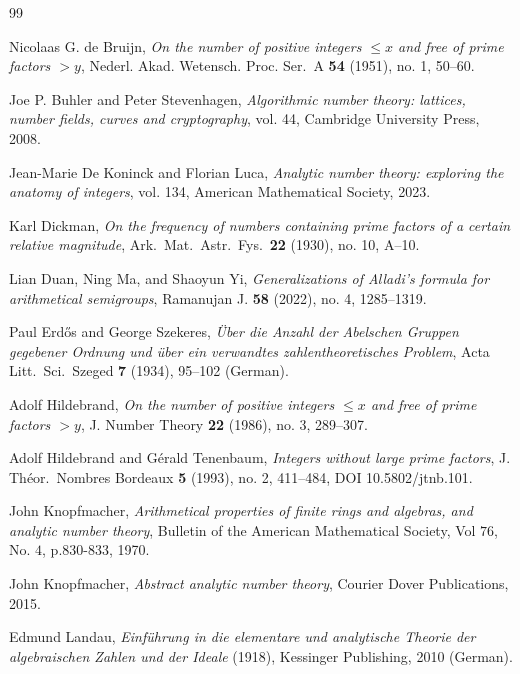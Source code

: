 \documentclass[a4paper]{amsart}
\begin{document}
\begin{thebibliography}{99}
 
Nicolaas G. de Bruijn, \emph{On the number of positive integers ${}\leq x$ and free of prime factors ${}> y$}, Nederl. Akad. Wetensch. Proc. Ser.\ A \textbf{54} (1951), no. 1, 50--60.
 
Joe P. Buhler and Peter Stevenhagen, \emph{Algorithmic number theory: lattices, number fields, curves and cryptography}, vol. 44, Cambridge University Press, 2008.
 
Jean-Marie De Koninck and Florian Luca, \emph{Analytic number theory: exploring the anatomy of integers}, vol. 134, American Mathematical Society, 2023.
 
Karl Dickman, \emph{On the frequency of numbers containing prime factors of a certain relative magnitude}, Ark.\ Mat.\ Astr.\ Fys.\ \textbf{22} (1930), no. 10, A--10.
 
Lian Duan, Ning Ma, and Shaoyun Yi, \emph{Generalizations of Alladi's formula for arithmetical semigroups}, Ramanujan J. \textbf{58} (2022), no. 4, 1285--1319.
 
Paul Erd\H{o}s and George Szekeres, \emph{\"Uber die Anzahl der Abelschen Gruppen gegebener Ordnung und \"uber ein verwandtes zahlentheoretisches Problem}, Acta Litt.\ Sci.\ Szeged \textbf{7} (1934), 95--102 (German).
 
Adolf Hildebrand, \emph{On the number of positive integers ${}\leq x$ and free of prime factors ${}> y$}, J. Number Theory \textbf{22} (1986), no. 3, 289--307.
 
Adolf Hildebrand and G\'erald Tenenbaum, \emph{Integers without large prime factors}, J. Th\'eor.\ Nombres Bordeaux \textbf{5} (1993), no. 2, 411--484, DOI 10.5802/jtnb.101.
 
John Knopfmacher, \emph{Arithmetical properties of finite rings and algebras, and analytic number theory}, Bulletin of the American Mathematical Society, Vol $76$, No. $4$, p.830-833, 1970.
 
John Knopfmacher, \emph{Abstract analytic number theory}, Courier Dover Publications, 2015.
 
Edmund Landau, \emph{Einf\"uhrung in die elementare und analytische Theorie der algebraischen Zahlen und der Ideale} (1918), Kessinger Publishing, 2010 (German).
 

\end{thebibliography}
\end{document}
